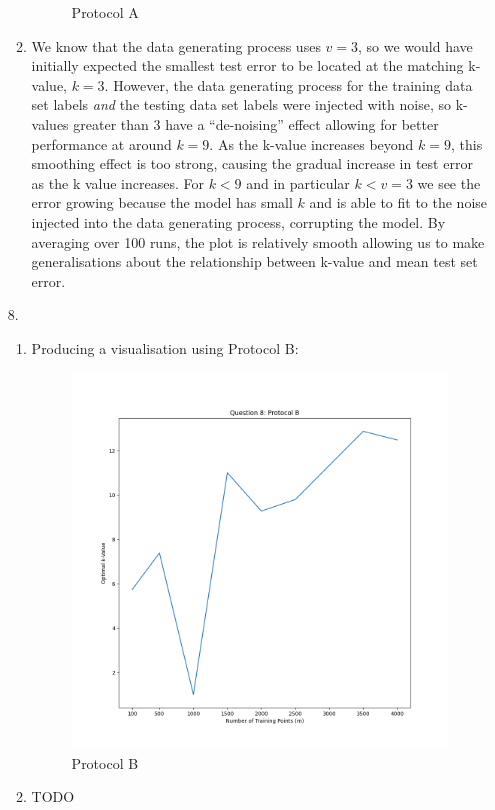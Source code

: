 \documentclass[12pt]{article}
\begin{document}
\begin{enumerate}[leftmargin=\labelsep]
\begin{enumerate}
\begin{figure}[h]
            \caption{Protocol A}
            \label{fig:7}
            \end{figure}
        \item We know that the data generating process uses $v=3$, so we would have initially expected the smallest test error to be located at the matching k-value, $k=3$.
        However, the data generating process for the training data set labels \textit{and} the testing data set labels were injected with noise, so k-values greater than 3 have a ``de-noising'' effect allowing for better performance at around $k=9$.
        As the k-value increases beyond $k=9$, this smoothing effect is too strong, causing the gradual increase in test error as the k value increases.
        For $k<9$ and in particular $k<v=3$ we see the error growing because the model has small $k$ and is able to fit to the noise injected into the data generating process, corrupting the model.
        By averaging over 100 runs, the plot is relatively smooth allowing us to make generalisations about the relationship between k-value and mean test set error.
    \end{enumerate}
\newpage
\item[8.]
    \begin{enumerate}
        \item Producing a visualisation using Protocol B:
            \begin{figure}[h]
            \centering
            \includegraphics[scale=0.5]{outputs/python/q8/q8}
            \caption{Protocol B}
            \label{fig:8}
            \end{figure}
        \item TODO
    \end{enumerate}
\newpage

\end{enumerate}
\end{document}
